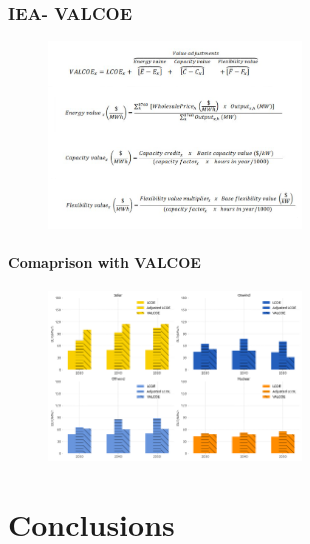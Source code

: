 \documentclass[aspectratio=169]{beamer}
\begin{document}
\begin{frame}{\insertsectionhead}
\frametitle{IEA- VALCOE}
\begin{figure}
    \centering
    \includegraphics[width=0.6\textwidth]{valcoe.png}
  
  \end{figure}
\end{frame}

\begin{frame}{\insertsectionhead}
\framesubtitle{Comaprison with VALCOE}
\begin{figure}
    \centering
    \includegraphics[width=0.6\textwidth]{valcoe_over.png}
  
  \end{figure}
\end{frame}
\section{Conclusions}
\end{document}

